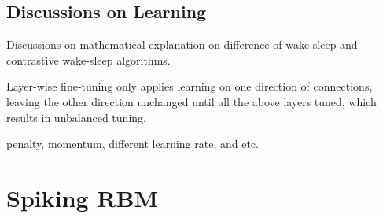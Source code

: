 \documentclass[11pt,twoside,a4paper]{article}
\begin{document}
	\subsection{Discussions on Learning}
	Discussions on mathematical explanation on difference of wake-sleep and contrastive wake-sleep algorithms.
	
	Layer-wise fine-tuning only applies learning on one direction of connections, leaving the other direction unchanged until all the above layers tuned, which results in unbalanced tuning.
	
	penalty, momentum, different learning rate, and etc.
\section{Spiking RBM\cite{neftci2013event}}
\end{document}
